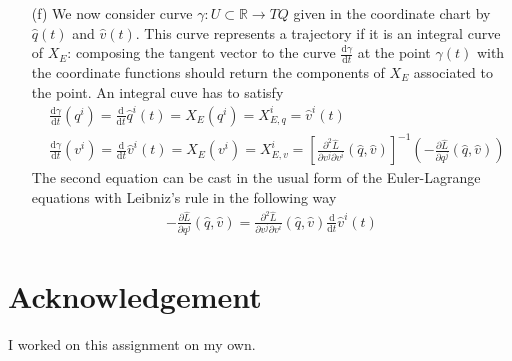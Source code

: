 \documentclass[10pt, a4paper]{article}
\begin{document}
{\begin{enumerate}
\begin{align*}
    &-X_{E,v}^{i} \frac{\partial^2 \hat{L}}{\partial v^j \partial v^i} (\hat{q}, \hat{v}) + v^i \frac{\partial^2 \hat{L}}{\partial q^i \partial v^j} (\hat{q}, \hat{v}) = X_{E,v}^{i} \frac{\partial^2 \hat{L}}{\partial v^j \partial v^i} (\hat{q}, \hat{v}) +  v^i \frac{1}{2}\left(\frac{\partial \hat{L}}{\partial q^i \partial v^j} (\hat{q}, \hat{v}) - \frac{\partial \hat{L}}{\partial q^j \partial v^i} (\hat{q}, \hat{v})\right) = v^i \frac{\partial^2 \hat{L}}{\partial q^i \partial v^j} (\hat{q}, \hat{v})  - \frac{\partial \hat{L}}{\partial q^j}(\hat{q}, \hat{v})\\
    &\implies X_{E,v}^{i} \left(\frac{\partial^2 \hat{L}}{\partial v^j \partial v^i} (\hat{q}, \hat{v})\right)= \left(\frac{v^i}{2} \frac{\partial^2 \hat{L}}{\partial q^i \partial v^j} (\hat{q}, \hat{v})  + \frac{v^i}{2}  \frac{\partial^2 \hat{L}}{\partial q^j \partial v^i} (\hat{q}, \hat{v}) - \frac{\partial \hat{L}}{\partial q^j}(\hat{q}, \hat{v})\right)\quad \text{$[]^{-1}$ exists because $\frac{\partial^2 \hat{L}}{\partial v^j \partial v^i} (\hat{q}, \hat{v})$ is regular} 
  \end{align*}
  \item[(f)] We now consider curve $\gamma : U \subset \mathbb{R} \to TQ$ given in the coordinate chart by $\hat{q}(t)$ and $\hat{v}(t)$. This curve represents a trajectory if it is an integral curve of $X_E$: composing the tangent vector to the curve $\frac{\text{d}\gamma}{\text{d}t}$ at the point $\gamma(t)$ with the coordinate functions should return the components of $X_E$ associated to the point. An integral cuve has to satisfy  
  \begin{align*}
    &\frac{\text{d}\gamma}{\text{d}t} (q^{i}) = \frac{\text{d}}{\text{d}t} \hat{q}^{i}(t) = X_E(q^{i}) = X_{E, q}^i = \hat{v}^i(t)\\
    &\frac{\text{d}\gamma}{\text{d}t} (v^{i}) = \frac{\text{d}}{\text{d}t}\hat{v}^{i}(t) = X_E(v^{i}) = X_{E, v}^i = \left[\frac{\partial^2 \hat{L}}{\partial v^j \partial v^i} (\hat{q}, \hat{v})\right]^{-1}\left(- \frac{\partial \hat{L}}{\partial q^j}(\hat{q}, \hat{v})\right)
  \end{align*}
  The second equation can be cast in the usual form of the Euler-Lagrange equations with Leibniz's rule in the following way 
  \begin{align*}
    - \frac{\partial \hat{L}}{\partial q^j}(\hat{q}, \hat{v}) =  \frac{\partial^2 \hat{L}}{\partial v^j \partial v^i} (\hat{q}, \hat{v}) \frac{\text{d}}{\text{d}t}\hat{v}^{i}(t)
  \end{align*} 

\end{enumerate}


\section{Acknowledgement}
I worked on this assignment on my own.


}

\makereferences


\end{document}
